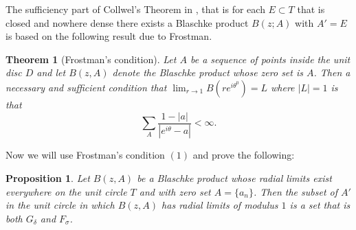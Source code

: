 \documentclass[12pt]{article}
\newtheorem{theorem}{Theorem}
\newtheorem{prp}{Proposition}
\begin{document}
\noindent The sufficiency part of Collwel's Theorem in \cite{PE}, that is for each $E\subset T$ that is closed and nowhere dense there exists a Blaschke product $B(z;A)$ with $A'=E$ is based on the following result due to Frostman.

\begin{theorem}[Frostman's condition] Let $A$ be a sequence of points inside the unit disc $D$ and let $B(z,A)$ denote the Blaschke product whose zero set is $A$. Then a necessary and sufficient condition that $\lim_{r\rightarrow 1}B(re^{i\theta^0})=L$ where $|L|=1$ is that \begin{equation}
\sum_A\frac{1-|a|}{|e^{i\theta}-a|}<\infty.
\end{equation}
\end{theorem}

\noindent Now we will use {Frostman's condition} $(1)$ and prove the following:

\begin{prp} Let $B(z,A)$ be a Blaschke product whose radial limits exist everywhere on the unit circle $T$ and with zero set $A=\lbrace a_n \rbrace$. Then the subset of $A'$ in the unit circle in which $B(z,A)$ has radial limits of modulus $1$ is a set that is both $G_{\delta}$ and $F_\sigma$. \end{prp}
\end{document}
